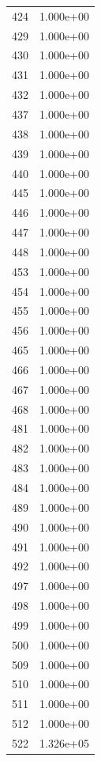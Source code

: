\documentclass[12pt]{article}
\begin{document}
\begin{longtable}{@{}cc@{}}
424 & 1.000e+00 \\
429 & 1.000e+00 \\
430 & 1.000e+00 \\
431 & 1.000e+00 \\
432 & 1.000e+00 \\
437 & 1.000e+00 \\
438 & 1.000e+00 \\
439 & 1.000e+00 \\
440 & 1.000e+00 \\
445 & 1.000e+00 \\
446 & 1.000e+00 \\
447 & 1.000e+00 \\
448 & 1.000e+00 \\
453 & 1.000e+00 \\
454 & 1.000e+00 \\
455 & 1.000e+00 \\
456 & 1.000e+00 \\
465 & 1.000e+00 \\
466 & 1.000e+00 \\
467 & 1.000e+00 \\
468 & 1.000e+00 \\
481 & 1.000e+00 \\
482 & 1.000e+00 \\
483 & 1.000e+00 \\
484 & 1.000e+00 \\
489 & 1.000e+00 \\
490 & 1.000e+00 \\
491 & 1.000e+00 \\
492 & 1.000e+00 \\
497 & 1.000e+00 \\
498 & 1.000e+00 \\
499 & 1.000e+00 \\
500 & 1.000e+00 \\
509 & 1.000e+00 \\
510 & 1.000e+00 \\
511 & 1.000e+00 \\
512 & 1.000e+00 \\
522 & 1.326e+05 \\

\bottomrule
\end{longtable}
\end{document}
